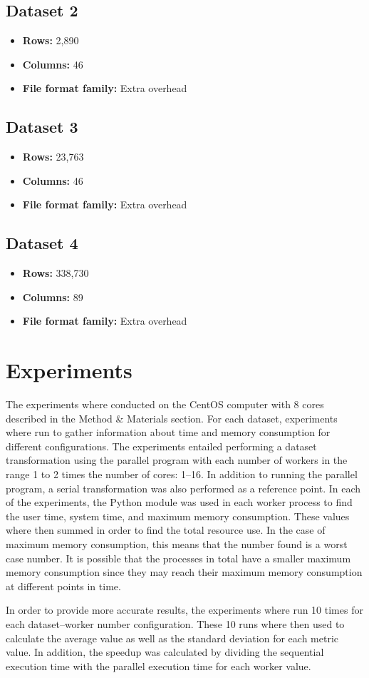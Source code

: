 \subsection{Dataset 2}
\begin{itemize}
  \item \textbf{Rows:} 2,890
  \item \textbf{Columns:} 46
  \item \textbf{File format family:} Extra overhead
\end{itemize}

\subsection{Dataset 3}
\begin{itemize}
  \item \textbf{Rows:} 23,763
  \item \textbf{Columns:} 46
  \item \textbf{File format family:} Extra overhead
\end{itemize}

\subsection{Dataset 4}
\begin{itemize}
  \item \textbf{Rows:} 338,730
  \item \textbf{Columns:} 89
  \item \textbf{File format family:} Extra overhead
\end{itemize}

\section{Experiments}
The experiments where conducted on the CentOS computer with 8 cores described in the Method \& Materials section.
For each dataset, experiments where run to gather information about time and memory consumption for different configurations.
The experiments entailed performing a dataset transformation using the parallel program with each number of workers in the range 1 to 2 times the number of cores: 1--16.
In addition to running the parallel program, a serial transformation was also performed as a reference point.
In each of the experiments, the Python  module was used in each worker process to find the user time, system time, and maximum memory consumption.
These values where then summed in order to find the total resource use. In the case of maximum memory consumption, this means that the number found is a worst case
number. It is possible that the processes in total have a smaller maximum memory consumption since they may reach their maximum memory consumption at different
points in time.

In order to provide more accurate results, the experiments where run 10 times for each dataset--worker number configuration. These 10 runs where then used to calculate the
average value as well as the standard deviation for each metric value. In addition, the speedup was calculated by dividing the sequential execution time with the parallel execution
time for each worker value.
